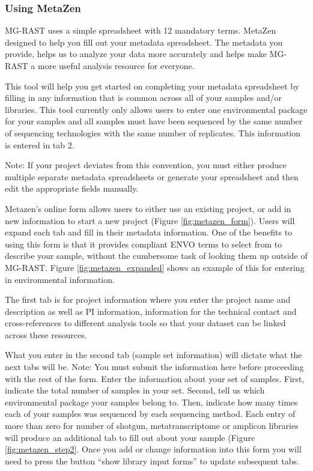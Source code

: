 \documentclass[12pt,fullpage]{report}
\begin{document}
\subsubsection{Using MetaZen}
\label{section:using_metazen}

MG-RAST uses a simple spreadsheet with 12 mandatory terms. MetaZen designed to help you fill out your metadata spreadsheet. The metadata you provide, helps us to analyze your data more accurately and helps make MG-RAST a more useful analysis resource for everyone.

This tool will help you get started on completing your metadata spreadsheet by filling in any information that is common across all of your samples and/or libraries. This tool currently only allows users to enter one environmental package for your samples and all samples must have been sequenced by the same number of sequencing technologies with the same number of replicates. This information is entered in tab 2. 

Note: If your project deviates from this convention, you must either produce multiple separate metadata spreadsheets or generate your spreadsheet and then edit the appropriate fields manually.

Metazen’s online form allows users to either use an existing project, or add in new information to start a new project (Figure \ref{fig:metazen_form}).  Users will expand each tab and fill in their metadata information. One of the benefits to using this form is that it provides compliant ENVO terms to select from to describe your sample, without the cumbersome task of looking them up outside of MG-RAST. Figure \ref{fig:metazen_expanded} shows an example of this for entering in environmental information.  

The first tab is for project information where you enter the project name and description as well as PI information, information for the technical contact and cross-references to different analysis tools so that your dataset can be linked across these resources. 

What you enter in the second tab (sample set information) will dictate what the next tabs will be. 
Note: You must submit the information here before proceeding with the rest of the form. 
Enter the information about your set of samples. First, indicate the total number of samples in your set. Second, tell us which environmental package your samples belong to. Then, indicate how many times each of your samples was sequenced by each sequencing method.  Each entry of more than zero for number of shotgun, metatranscriptome or amplicon libraries will produce an additional tab to fill out about your sample (Figure \ref{fig:metazen_step2}.  Once you add or change information into this form you will need to press the button “show library input forms” to update subsequent tabs.
\end{document}
